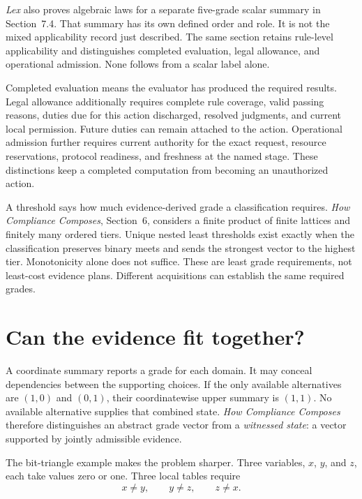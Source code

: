 \documentclass{momentum}
\begin{document}
\emph{Lex} also proves algebraic laws for a separate five-grade scalar summary in Section~7.4. That summary has its own defined order and role. It is not the mixed applicability record just described. The same section retains rule-level applicability and distinguishes completed evaluation, legal allowance, and operational admission. None follows from a scalar label alone.

Completed evaluation means the evaluator has produced the required results. Legal allowance additionally requires complete rule coverage, valid passing reasons, duties due for this action discharged, resolved judgments, and current local permission. Future duties can remain attached to the action. Operational admission further requires current authority for the exact request, resource reservations, protocol readiness, and freshness at the named stage. These distinctions keep a completed computation from becoming an unauthorized action. \cite[Section~7.4]{lex}

A threshold says how much evidence-derived grade a classification requires. \emph{How Compliance Composes}, Section~6, considers a finite product of finite lattices and finitely many ordered tiers. Unique nested least thresholds exist exactly when the classification preserves binary meets and sends the strongest vector to the highest tier. Monotonicity alone does not suffice. These are least grade requirements, not least-cost evidence plans. Different acquisitions can establish the same required grades. \cite[Section~6, Classification of tier maps]{composes}

\section{Can the evidence fit together?}

A coordinate summary reports a grade for each domain. It may conceal dependencies between the supporting choices. If the only available alternatives are $(1,0)$ and $(0,1)$, their coordinatewise upper summary is $(1,1)$. No available alternative supplies that combined state. \emph{How Compliance Composes} therefore distinguishes an abstract grade vector from a \emph{witnessed state}: a vector supported by jointly admissible evidence. \cite[Section~3.3]{composes}

The bit-triangle example makes the problem sharper. Three variables, $x$, $y$, and $z$, each take values zero or one. Three local tables require
\[
x\ne y,\qquad y\ne z,\qquad z\ne x.
\]
\end{document}
